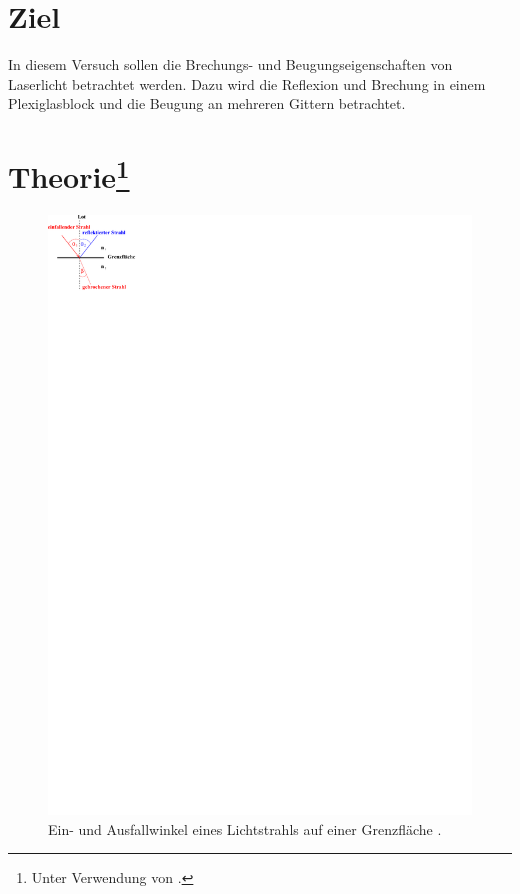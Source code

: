 \section{Ziel}
In diesem Versuch sollen die Brechungs- und Beugungseigenschaften von Laserlicht betrachtet werden.
Dazu wird die Reflexion und Brechung in einem Plexiglasblock und die Beugung an mehreren Gittern betrachtet.

\section[Theorie]{Theorie\footnote[1]{Unter Verwendung von \cite{man:v400}.}}
\begin{figure}
    \includegraphics{Abbildungen/Ein_Ausfallwinkel.pdf}
    \caption{Ein- und Ausfallwinkel eines Lichtstrahls auf einer Grenzfläche \cite{man:v400}.}
\end{figure}
